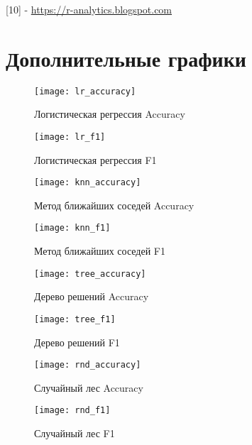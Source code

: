 \documentclass{article}
\begin{document}
	[10] - \href{https://r-analytics.blogspot.com/2012/03/t.html}{https://r-analytics.blogspot.com}
	\pagebreak
	\section{Дополнительные графики}
	\begin{figure}[h]
		\centering
		\label{lr_accuracy}
		\texttt{[image: lr\_accuracy]}
		\caption{Логистическая регрессия Accuracy}
	\end{figure}
	\begin{figure}[h]
		\centering
		\label{lr_f1}
		\texttt{[image: lr\_f1]}
		\caption{Логистическая регрессия F1}
	\end{figure}
	\begin{figure}[h]
		\centering
		\label{knn_accuracy}
		\texttt{[image: knn\_accuracy]}
		\caption{Метод ближайших соседей Accuracy}
	\end{figure}
	\begin{figure}[h]
		\centering
		\label{knn_f1}
		\texttt{[image: knn\_f1]}
		\caption{Метод ближайших соседей F1}
	\end{figure}
	\begin{figure}[h]
		\centering
		\label{tree_accuracy}
		\texttt{[image: tree\_accuracy]}
		\caption{Дерево решений Accuracy}
	\end{figure}
	\begin{figure}[h]
		\centering
		\label{tree_f1}
		\texttt{[image: tree\_f1]}
		\caption{Дерево решений F1}
	\end{figure}
	\begin{figure}[h]
		\centering
		\label{rnd_accuracy}
		\texttt{[image: rnd\_accuracy]}
		\caption{Случайный лес Accuracy}
	\end{figure}
	\begin{figure}[h]
		\centering
		\label{rnd_f1}
		\texttt{[image: rnd\_f1]}
		\caption{Случайный лес F1}
	\end{figure}
\end{document}
